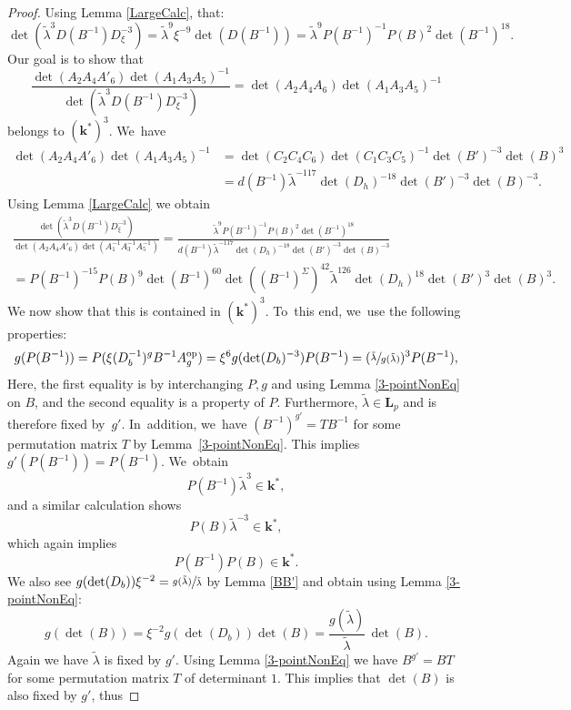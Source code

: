 \documentclass[JEP,XML,SOM,Unicode,NoFloatCountersInSection, NoEqCountersInSection,published]{cedram}
\newcommand{\op}{\textup{op}}
\theoremstyle{definition}
\newcommand{\kk}{{\boldsymbol{k}}}
\newcommand{\LL}{{\boldsymbol{L}}}
\begin{document}
\begin{proof}
Using Lemma \ref{LargeCalc}, that:
\[
\det(\tilde \lambda^3 D(B^{-1})D_{\xi}^{-3}) = \tilde \lambda^9 \xi^{-9} \det(D(B^{-1})) = \tilde \lambda^9 P(B^{-1})^{-1} P(B)^2 \det(B^{-1})^{18}.
\]
Our goal is to show that
\[
\frac{\det(A_2A_4A'_6)\det(A_1A_3A_5)^{-1}} {\det(\tilde \lambda^{3}D(B^{-1}) D_{\xi}^{-3})} = \det(A_2A_4A_6)\det(A_1A_3A_5)^{-1}
\]
belongs to $(\kk^*)^3$. We~have
\begin{align*}
\det(A_2A_4A'_6)\det(A_1A_3A_5)^{-1} &= \det(C_2C_4C_6)\det(C_1C_3C_5)^{-1} \det(B')^{-3}\det(B)^3
\\
&= d(B^{-1}) \tilde \lambda^{-117} \det(D_h)^{-18}\det(B')^{-3}\det(B)^{-3}.
\end{align*}
Using Lemma \ref{LargeCalc} we obtain
\begin{multline*}
\frac{\det(\tilde \lambda^3 D(B^{-1})D_{\xi}^{-3})}{\det(A_2A_4A'_6)\det(A_1^{-1}A_3^{-1}A_5^{-1})} = \frac{\tilde \lambda^9 P(B^{-1})^{-1} P(B)^2 \det(B^{-1})^{18}}{d(B^{-1}) \tilde \lambda^{-117} \det(D_h)^{-18}\det(B')^{-3}\det(B)^{-3}}
\\
= P(B^{-1})^{-15} P(B)^9 \det(B^{-1})^{60} \det((B^{-1})^{\Sigma})^{42} \tilde \lambda^{126} \det(D_h)^{18}\det(B')^3\det(B)^3.
\end{multline*}
We now show that this is contained in $(\kk^*)^3$. To~this end, we~use the following properties:
\[
g(P(B^{-1})) = P(\xi (D_b^{-1})^gB^{-1}A_g^{\op}) = \xi^6 g(\det(D_b)^{-3}) P(B^{-1}) = (\sfrac{\tilde \lambda}{g(\tilde \lambda)})^3P(B^{-1}),
\]
Here, the first equality is by interchanging $P,g$ and using Lemma \ref{3-pointNonEq} on $B$, and the second equality is a property of $P$. Furthermore, $\tilde{\lambda} \in \LL_p$ and is therefore fixed by~$g'$. In~addition, we~have $(B^{-1})^{g'} = T B^{-1}$ for some permutation matrix $T$ by Lemma~\ref{3-pointNonEq}. This implies $g'(P(B^{-1})) = P(B^{-1})$. We~obtain
\begin{equation} \label{eq:1P}
P(B^{-1}) \tilde \lambda^3 \in \kk^*,
\end{equation}
and a similar calculation shows
\[
P(B)\tilde \lambda^{-3} \in \kk^*,
\]
which again implies
\begin{equation} \label{eq:2Ps}
P(B^{-1})P(B)\in \kk^*.
\end{equation}
We also see $g(\det(D_b))\xi^{-2} = \sfrac{g(\tilde \lambda)}{\tilde \lambda}$ by Lemma \ref{BB'} and obtain using Lemma \ref{3-pointNonEq}:
\[
g(\det(B)) = \xi^{-2} g(\det(D_b)) \det(B) = \frac{g(\tilde \lambda)}{\tilde \lambda}\, \det(B).
\]
Again we have $\tilde{\lambda}$ is fixed by $g'$. Using Lemma \ref{3-pointNonEq} we have $B^{g'} = B T$ for some permutation matrix $T$ of determinant $1$. This implies that $\det(B)$ is also fixed by $g'$, thus\vspace*{-3pt}

\end{proof}
\end{document}
